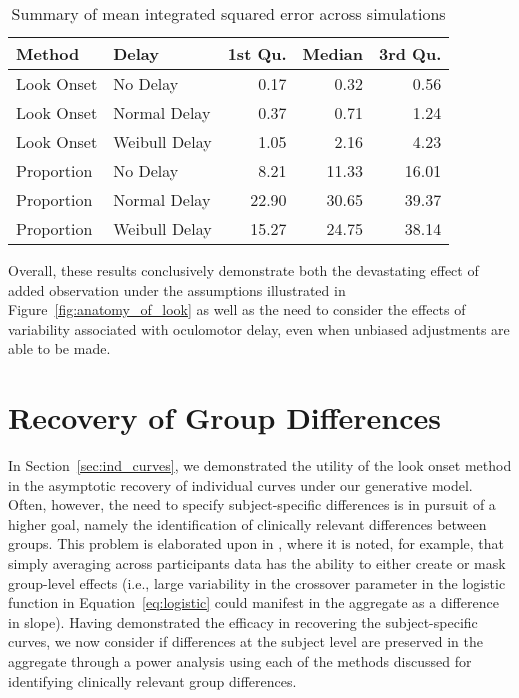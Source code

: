\begin{table}[H]
\centering
\begin{tabular}{llrrr}
  \hline
Method & Delay & 1st Qu. & Median & 3rd Qu. \\ 
  \hline
Look Onset & No Delay & 0.17 & 0.32 & 0.56 \\ 
  Look Onset & Normal Delay & 0.37 & 0.71 & 1.24 \\ 
  Look Onset & Weibull Delay & 1.05 & 2.16 & 4.23 \\ 
  Proportion & No Delay & 8.21 & 11.33 & 16.01 \\ 
  Proportion & Normal Delay & 22.90 & 30.65 & 39.37 \\ 
  Proportion & Weibull Delay & 15.27 & 24.75 & 38.14 \\ 
   \hline
\end{tabular}
\caption{Summary of mean integrated squared error across simulations}
\label{tab:mise_sims}
\end{table}

Overall, these results conclusively demonstrate both the devastating effect of added observation under the assumptions illustrated in Figure~\ref{fig:anatomy_of_look} as well as the need to consider the effects of variability associated with oculomotor delay, even when unbiased adjustments are able to be made. 


\section{Recovery of Group Differences}



In Section~\ref{sec:ind_curves}, we demonstrated the utility of the look onset method in the asymptotic recovery of individual curves under our generative model. Often, however, the need to specify subject-specific differences is in pursuit of a higher goal, namely the identification of clinically relevant differences between groups. This problem is elaborated upon in \citet{mcmurray2010individual}, where it is noted, for example, that simply averaging across participants data has the ability to either create or mask group-level effects (i.e., large variability in the crossover parameter in the logistic function in Equation~\ref{eq:logistic} could manifest in the aggregate as a difference in slope). Having demonstrated the efficacy in recovering the subject-specific curves, we now consider if differences at the subject level are preserved in the aggregate through a power analysis using each of the methods discussed for identifying clinically relevant group differences. 

